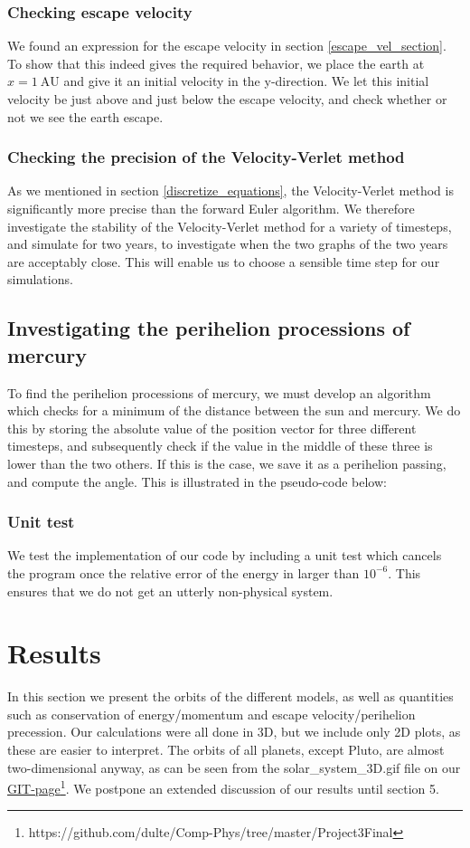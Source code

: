 \documentclass[a4paper, 10pt]{article}
\begin{document}
\subsubsection{Checking escape velocity}
We found an expression for the escape velocity in section \ref{escape_vel_section}. To show that this indeed gives the required behavior, we place the earth at $x=1\ \mathrm{AU}$ and give it an initial velocity in the y-direction. We let this initial velocity be just above and just below the escape velocity, and check whether or not we see the earth escape.
\subsubsection{Checking the precision of the Velocity-Verlet method}
As we mentioned in section \ref{discretize_equations}, the Velocity-Verlet method is significantly more precise than the forward Euler algorithm. We therefore investigate the stability of the Velocity-Verlet method for a variety of timesteps, and simulate for two years, to investigate when the two graphs of the two years are acceptably close. This will enable us to choose a sensible time step for our simulations.
\subsection{Investigating the perihelion processions of mercury}
To find the perihelion processions of mercury, we must develop an algorithm which checks for a minimum of the distance between the sun and mercury. We do this by storing the absolute value of the position vector for three different timesteps, and subsequently check if the value in the middle of these three is lower than the two others. If this is the case, we save it as a perihelion passing, and compute the angle. This is illustrated in the pseudo-code below:

\subsubsection{Unit test}
We test the implementation of our code by including a unit test which cancels the program once the relative error of the energy in larger than $10^{-6}$. This ensures that we do not get an utterly non-physical system.
\newpage

\section{Results}
In this section we present the orbits of the different models, as well as quantities such as conservation of energy/momentum and escape velocity/perihelion precession. Our calculations were all done in 3D, but we include only 2D plots, as these are easier to interpret. The orbits of all planets, except Pluto, are almost two-dimensional anyway, as can be seen from the solar\_system\_3D.gif file on our \href{https://github.com/dulte/Comp-Phys/tree/master/Project3Final}{GIT-page}\footnote{https://github.com/dulte/Comp-Phys/tree/master/Project3Final}. We postpone an extended discussion of our results until section 5.
\end{document}
